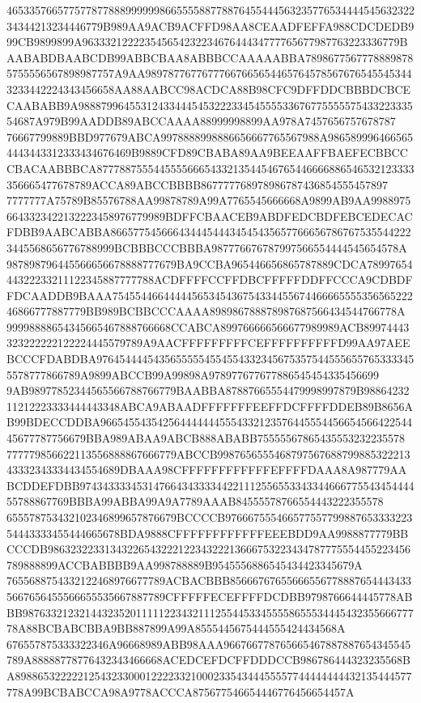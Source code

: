 46533576657757787788899999986655558877887645544456323577653444454563232234344213234446779B989AA9ACB9ACFFD98AA8CEAADFEFFA988CDCDEDB999CB9899899A96333212222354565423223467644434777765677987763223336779BAABABDBAABCDB99ABBCBAA8ABBBCCAAAAABBA7898677567778889878
5755556567898987757A9AA989787767767776676656544657645785676765455453443233442224343456658AA88AABCC98ACDCA88B98CFC9DFFDDCBBBDCBCECAABABB9A9888799645531243344454532223345455553367677555557543322333554687A979B99AADDB89ABCCAAAA88999998899AA978A7457656757678787
76667799889BBD977679ABCA9978888998886656667765567988A9865899964665654443443312333434676469B9889CFD89CBABA89AA9BEEAAFFBAEFECBBCCCBACAABBBCA87778875554455556665433213544546765446666886546532123333356665477678789ACCA89ABCCBBBB867777768978986787436854555457897
7777777A75789B85576788AA99878789A99A7765545666668A9899AB9AA99889756643323422132223458976779989BDFFCBAACEB9ABDFEDCBDFEBCEDECACFDBB9AABCABBA866577545666434445444345454356577666567867675355442223445568656776788999BCBBBCCCBBBA987776676787997566554444545654578A
987898796445566656678888777679BA9CCBA965446656865787889CDCA7899765444322233211122345887777788ACDFFFFCCFFDBCFFFFFDDFFCCCA9CDBDFFDCAADDB9BAAA7545544664444456534543675433445567446666555535656522246866777887779BB989BCBBCCCAAAA898986788878987687566434544766778A
99998888654345665467888766668CCABCA899766666566677989989ACB89974443323222222122224445579789A9AACFFFFFFFFFCEFFFFFFFFFFD99AA97AEEBCCCFDABDBA976454444543565555545545543323456753575445556557653333455578777866789A9899ABCCB99A99898A978977677677886545454335456699
9AB98977852344565566788766779BAABBA87887665554479998997879B9886423211212223333444443348ABCA9ABAADFFFFFFFEEFFDCFFFFDDEB89B8656AB99BDECCDDBA966545543542564444444555433212357644555445665456642254445677787756679BBA989ABAA9ABCB888ABABB75555567865435553232235578
777779856622113556888867666779ABCCB998765655546879756768879988532221343332343334434554689DBAAA98CFFFFFFFFFFFFEFFFFDAAA8A987779AABCDDEFDBB9743433334531476643433334422111255655334334466677554345444455788867769BBBA99ABBA99A9A7789AAAB84555578766554443222355578
655578753432102346899657876679BCCCCB97666755546657755779988765333322354443333455444665678BDA9888CFFFFFFFFFFFFEEEBDD9AA9988877779BBCCCDB9863232233134322654322212234322213666753223434787775554455223456789888899ACCBABBBB9AA998788889B9545556886545434423345679A
7655688754332122468976677789ACBACBBB856667676556665567788876544434335667656455566655535667887789CFFFFFECEFFFFDCDBB9798766644445778ABBB98763321232144323520111112234321112554453345555865553444543235566677778A88BCBABCBBA9BB887899A99A8555445675444555424434568A
676557875333322346A96668989ABB98AAA966766778765665467887887654345545789A88888778776432343466668ACEDCEFDCFFDDDCCB986786444323235568BA8988653222221254323300012222332100023354344455557744444444432135444577778A99BCBABCCA98A9778ACCCA875677546654446776456654457A
